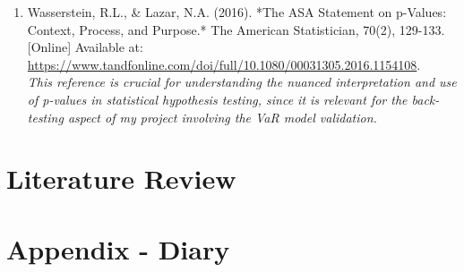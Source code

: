 \documentclass{article}
\begin{document}
\begin{small}
\begin{enumerate}
  \item\label{ref11} Wasserstein, R.L., \& Lazar, N.A. (2016). *The ASA Statement on p-Values: Context, Process, and Purpose.* The American Statistician, 70(2), 129-133. [Online] Available at: \url{https://www.tandfonline.com/doi/full/10.1080/00031305.2016.1154108}.
  \\\textit{This reference is crucial for understanding the nuanced interpretation and use of p-values in statistical hypothesis testing, since it is  relevant for the back-testing aspect of my project involving the VaR model validation.}

  
\end{enumerate}
\end{small}

\section{Literature Review}

\section{Appendix - Diary}
\end{document}
